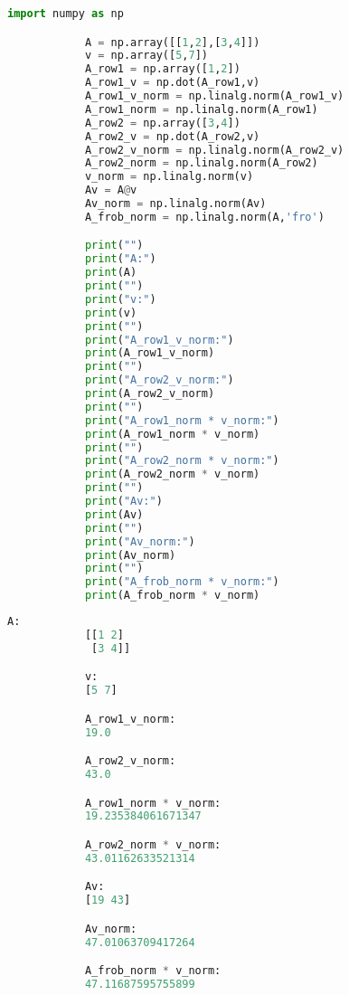 \begin{example}
    \begin{tcolorbox}[sharp corners, colback=black!5!white, colframe=black!75!black, fontupper=\color{black}]
        \begin{lstlisting}[language=python, gobble = 12]
            import numpy as np

            A = np.array([[1,2],[3,4]])
            v = np.array([5,7])
            A_row1 = np.array([1,2])
            A_row1_v = np.dot(A_row1,v)
            A_row1_v_norm = np.linalg.norm(A_row1_v)
            A_row1_norm = np.linalg.norm(A_row1)
            A_row2 = np.array([3,4])
            A_row2_v = np.dot(A_row2,v)
            A_row2_v_norm = np.linalg.norm(A_row2_v)
            A_row2_norm = np.linalg.norm(A_row2)
            v_norm = np.linalg.norm(v)
            Av = A@v
            Av_norm = np.linalg.norm(Av)
            A_frob_norm = np.linalg.norm(A,'fro')

            print("")
            print("A:")
            print(A)
            print("")
            print("v:")
            print(v)
            print("")
            print("A_row1_v_norm:")
            print(A_row1_v_norm)
            print("")
            print("A_row2_v_norm:")
            print(A_row2_v_norm) 
            print("")
            print("A_row1_norm * v_norm:")
            print(A_row1_norm * v_norm)
            print("")
            print("A_row2_norm * v_norm:")
            print(A_row2_norm * v_norm)
            print("")
            print("Av:")
            print(Av)
            print("")
            print("Av_norm:")
            print(Av_norm)
            print("")
            print("A_frob_norm * v_norm:")
            print(A_frob_norm * v_norm)
        \end{lstlisting}
    \end{tcolorbox}

    \begin{tcolorbox}[sharp corners, colback=green!10!white, colframe=black!75!black, fontupper=\color{black}]
        \begin{lstlisting}[language=python, gobble = 12]
            A:
            [[1 2]
             [3 4]]

            v:
            [5 7]

            A_row1_v_norm:
            19.0

            A_row2_v_norm:
            43.0

            A_row1_norm * v_norm:
            19.235384061671347

            A_row2_norm * v_norm:
            43.01162633521314

            Av:
            [19 43]

            Av_norm:
            47.01063709417264

            A_frob_norm * v_norm:
            47.11687595755899
        \end{lstlisting}
    \end{tcolorbox}
\end{example}

